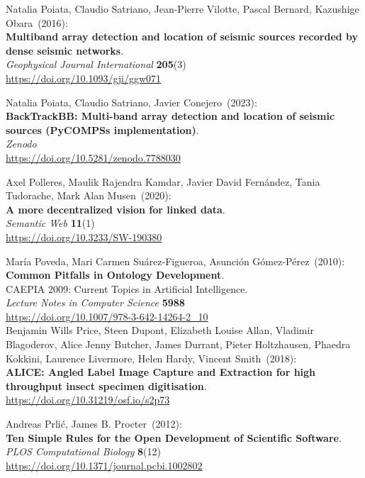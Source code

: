 \begin{thebibliography}{9}
Natalia Poiata, Claudio Satriano, Jean-Pierre Vilotte, Pascal Bernard, Kazushige Obara~(2016): \\
\textbf{Multiband array detection and location of seismic sources recorded by dense seismic networks}.\\
\emph{Geophysical Journal International} \textbf{205}(3)\\
\url{https://doi.org/10.1093/gji/ggw071}

Natalia Poiata, Claudio Satriano, Javier Conejero~(2023): \\
\textbf{BackTrackBB: Multi-band array detection and location of seismic sources (PyCOMPSs implementation)}.\\
\emph{Zenodo}\\
\url{https://doi.org/10.5281/zenodo.7788030}

Axel Polleres, Maulik Rajendra Kamdar, Javier David Fernández, Tania Tudorache, Mark Alan Musen~(2020): \\
\textbf{A more decentralized vision for linked data}.\\ 
\emph{Semantic Web} \textbf{11}(1) \\
\url{https://doi.org/10.3233/SW-190380}

María Poveda, Mari Carmen Suárez-Figueroa, Asunción Gómez-Pérez~(2010): \\
\textbf{Common Pitfalls in Ontology Development}.\\
CAEPIA 2009: Current Topics in Artificial Intelligence.\\
\emph{Lecture Notes in Computer Science} \textbf{5988}\\
\url{https://doi.org/10.1007/978-3-642-14264-2_10}\\

Benjamin Wills Price, Steen Dupont, Elizabeth Louise Allan, Vladimir Blagoderov, Alice Jenny Butcher, James Durrant, Pieter Holtzhausen, Phaedra Kokkini, Laurence Livermore, Helen Hardy, Vincent Smith~(2018): \\
\textbf{ALICE: Angled Label Image Capture and Extraction for high throughput insect specimen digitisation}.\\
\url{https://doi.org/10.31219/osf.io/s2p73}

Andreas Prlić, James B. Procter~(2012):\\
\textbf{Ten Simple Rules for the Open Development of Scientific Software}.\\
\emph{PLOS Computational Biology} \textbf{8}(12) \\
\url{https://doi.org/10.1371/journal.pcbi.1002802}


\end{thebibliography}
